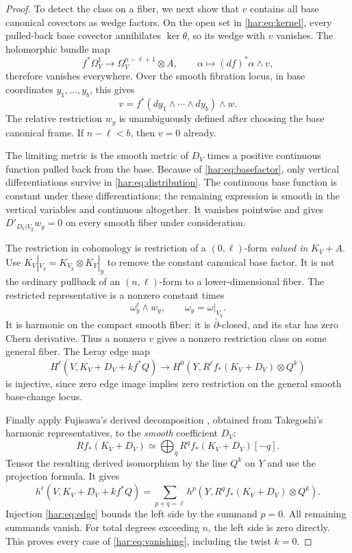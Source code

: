 \begin{proof}
To detect the class on a fiber, we next show that \(v\) contains all
base canonical covectors as wedge factors. On the open set in
\eqref{har:eq:kernel}, every pulled-back base covector annihilates
\(\ker\theta\), so its wedge with \(v\) vanishes. The holomorphic
bundle map
\[
 f^*\Omega_Y^1\longrightarrow\Omega_V^{n-\ell+1}\otimes A,
 \qquad \alpha\longmapsto (df)^*\alpha\wedge v,
\]
therefore vanishes everywhere. Over the smooth fibration locus, in
base coordinates \(y_1,\ldots,y_b\), this gives
\begin{equation}\label{har:eq:basefactor}
 v=f^*(dy_1\wedge\cdots\wedge dy_b)\wedge w.
\end{equation}
The relative restriction \(w_y\) is unambiguously defined after choosing
the base canonical frame. If \(n-\ell<b\), then \(v=0\) already.

The limiting metric is the smooth metric of \(D_V\) times a positive
continuous function pulled back from the base. Because of
\eqref{har:eq:basefactor}, only vertical differentiations survive in
\eqref{har:eq:distribution}.
The continuous base function is constant under these differentiations;
the remaining expression is smooth in the vertical variables and
continuous altogether. It vanishes pointwise and gives
\(D'_{D_V|V_y}w_y=0\) on every smooth fiber under consideration.

The restriction in cohomology is restriction of a \((0,\ell)\)-form
\emph{valued in} \(K_V+A\). Use
\(K_V|_{V_y}=K_{V_y}\otimes K_Y|_y\) to remove the constant canonical
base factor. It is not the ordinary pullback of an \((n,\ell)\)-form to
a lower-dimensional fiber. The restricted representative is a nonzero
constant times
\[
 \omega_y^\ell\wedge w_y,
 \qquad \omega_y=\omega|_{V_y}.
\]
It is harmonic on the compact smooth fiber: it is \(\bar\partial\)-closed,
and its star has zero Chern derivative. Thus a nonzero \(v\) gives a
nonzero restriction class on some general fiber. The Leray edge map
\begin{equation}\label{har:eq:edge}
 H^\ell(V,K_V+D_V+kf^*Q)
 \longrightarrow H^0(Y,R^\ell f_*(K_V+D_V)\otimes Q^k)
\end{equation}
is injective, since zero edge image implies zero restriction on the
general smooth base-change locus.

Finally apply Fujisawa's derived decomposition
\cite[Theorem~1]{Fujisawa2015}, obtained from Takegoshi's harmonic
representatives, to the \emph{smooth} coefficient \(D_V\):
\[
 Rf_*(K_V+D_V)\simeq\bigoplus_q R^q f_*(K_V+D_V)[-q].
\]
Tensor the resulting derived isomorphism by the line \(Q^k\) on \(Y\)
and use the projection formula. It gives
\[
 h^\ell(V,K_V+D_V+kf^*Q)
 =\sum_{p+q=\ell}h^p(Y,R^qf_*(K_V+D_V)\otimes Q^k).
\]
Injection \eqref{har:eq:edge} bounds the left side by the summand \(p=0\).
All remaining summands vanish. For total degrees exceeding \(n\), the
left side is zero directly. This proves every case of
\eqref{har:eq:vanishing}, including the twist \(k=0\).
\end{proof}

